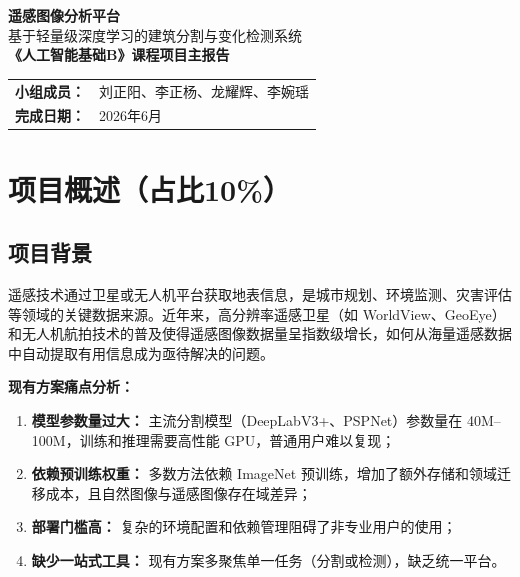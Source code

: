 \documentclass[12pt,a4paper]{article}
\begin{document}
\begin{titlepage}
\centering
\vspace*{3cm}
{\Huge\bfseries 遥感图像分析平台}\\[0.8cm]
{\large 基于轻量级深度学习的建筑分割与变化检测系统}\\[1.5cm]
{\large \textbf{《人工智能基础B》课程项目主报告}}\\[0.5cm]
\vfill
\begin{tabular}{rl}
\textbf{小组成员：} & 刘正阳、李正杨、龙耀辉、李婉瑶 \\
\textbf{完成日期：} & 2026年6月 \\
\end{tabular}
\vspace{2cm}
\end{titlepage}

\newpage
\tableofcontents
\newpage

\section{项目概述（占比10\%）}

\subsection{项目背景}

遥感技术通过卫星或无人机平台获取地表信息，是城市规划、环境监测、灾害评估等领域的关键数据来源。近年来，高分辨率遥感卫星（如 WorldView、GeoEye）和无人机航拍技术的普及使得遥感图像数据量呈指数级增长，如何从海量遥感数据中自动提取有用信息成为亟待解决的问题。

\textbf{现有方案痛点分析：}

\begin{enumerate}
    \item \textbf{模型参数量过大：} 主流分割模型（DeepLabV3+、PSPNet）参数量在 40M--100M，训练和推理需要高性能 GPU，普通用户难以复现；
    \item \textbf{依赖预训练权重：} 多数方法依赖 ImageNet 预训练，增加了额外存储和领域迁移成本，且自然图像与遥感图像存在域差异；
    \item \textbf{部署门槛高：} 复杂的环境配置和依赖管理阻碍了非专业用户的使用；
    \item \textbf{缺少一站式工具：} 现有方案多聚焦单一任务（分割或检测），缺乏统一平台。
\end{enumerate}
\end{document}
